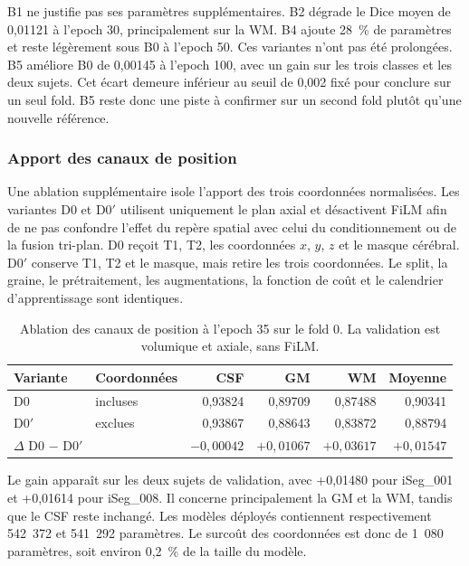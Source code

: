 \documentclass[11pt,a4paper]{article}
\begin{document}
B1 ne justifie pas ses paramètres supplémentaires. B2 dégrade le Dice moyen de
0,01121 à l'epoch 30, principalement sur la WM. B4 ajoute 28~\% de paramètres
et reste légèrement sous B0 à l'epoch 50. Ces variantes n'ont pas été
prolongées. B5 améliore B0 de 0,00145 à l'epoch 100, avec un gain sur les trois
classes et les deux sujets. Cet écart demeure inférieur au seuil de 0,002 fixé
pour conclure sur un seul fold. B5 reste donc une piste à confirmer sur un
second fold plutôt qu'une nouvelle référence.

\subsubsection{Apport des canaux de position}

Une ablation supplémentaire isole l'apport des trois coordonnées normalisées.
Les variantes D0 et D0$'$ utilisent uniquement le plan axial et désactivent
FiLM afin de ne pas confondre l'effet du repère spatial avec celui du
conditionnement ou de la fusion tri-plan. D0 reçoit T1, T2, les coordonnées
$x$, $y$, $z$ et le masque cérébral. D0$'$ conserve T1, T2 et le masque, mais
retire les trois coordonnées. Le split, la graine, le prétraitement, les
augmentations, la fonction de coût et le calendrier d'apprentissage sont
identiques.

\begin{table}[htbp]
\centering
\small
\caption{Ablation des canaux de position à l'epoch 35 sur le fold 0. La
validation est volumique et axiale, sans FiLM.}
\label{tab:coordinates}
\begin{tabular}{@{}llrrrr@{}}
\toprule
Variante & Coordonnées & CSF & GM & WM & Moyenne \\
\midrule
D0 & incluses & 0,93824 & 0,89709 & 0,87488 & 0,90341 \\
D0$'$ & exclues & 0,93867 & 0,88643 & 0,83872 & 0,88794 \\
\midrule
$\Delta$ D0 $-$ D0$'$ & & $-0{,}00042$ & $+0{,}01067$ & $+0{,}03617$ & \textbf{$+0{,}01547$} \\
\bottomrule
\end{tabular}
\end{table}
\FloatBarrier

Le gain apparaît sur les deux sujets de validation, avec +0,01480 pour
iSeg\_001 et +0,01614 pour iSeg\_008. Il concerne principalement la GM et la
WM, tandis que le CSF reste inchangé. Les modèles déployés contiennent
respectivement 542~372 et 541~292 paramètres. Le surcoût des coordonnées est
donc de 1~080 paramètres, soit environ 0,2~\% de la taille du modèle.
\end{document}
